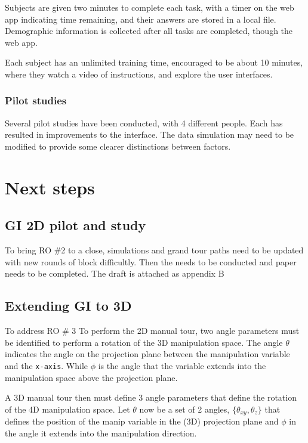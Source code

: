 \documentclass[
  11,
]{article}
\begin{document}
Subjects are given two minutes to complete each task, with a timer on the web app indicating time remaining, and their answers are stored in a local file. Demographic information is collected after all tasks are completed, though the web app.

Each subject has an unlimited training time, encouraged to be about 10 minutes, where they watch a video of instructions, and explore the user interfaces.

\hypertarget{pilot-studies}{%
\subsubsection{Pilot studies}\label{pilot-studies}}

Several pilot studies have been conducted, with 4 different people. Each has resulted in improvements to the interface. The data simulation may need to be modified to provide some clearer distinctions between factors.

\hypertarget{next-steps}{%
\section{Next steps}\label{next-steps}}

\hypertarget{gi-2d-pilot-and-study}{%
\subsection{GI 2D pilot and study}\label{gi-2d-pilot-and-study}}

To bring RO \#2 to a close, simulations and grand tour paths need to be updated with new rounds of block difficultly. Then the needs to be conducted and paper needs to be completed. The draft is attached as appendix B

\hypertarget{extending-gi-to-3d}{%
\subsection{Extending GI to 3D}\label{extending-gi-to-3d}}

To address RO \# 3 To perform the 2D manual tour, two angle parameters must be identified to perform a rotation of the 3D manipulation space. The angle \(\theta\) indicates the angle on the projection plane between the manipulation variable and the \texttt{x-axis}. While \(\phi\) is the angle that the variable extends into the manipulation space above the projection plane.

A 3D manual tour then must define 3 angle parameters that define the rotation of the 4D manipulation space. Let \(\theta\) now be a set of 2 angles, \(\{\theta_{xy}, \theta_z\}\) that defines the position of the manip variable in the (3D) projection plane and \(\phi\) in the angle it extends into the manipulation direction.
\end{document}

